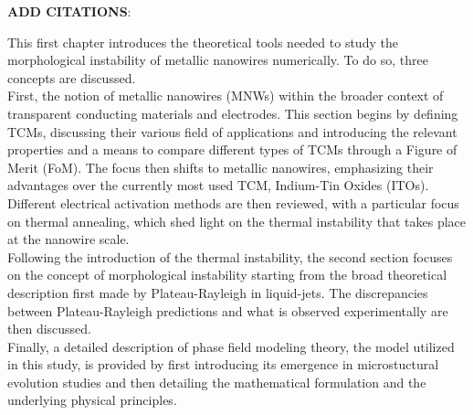 \textbf{ADD CITATIONS}: \cite{Huong2022} \cite{Willis2021} \cite{Maurya2022} \cite{LagrangeLangleyGiustiJimenezBrechetBellet2015} \cite{LangleyGiustiMayousseCelleBelletSimonato2013} \cite{SohnParkOhKangKim2019} \cite{Bellet2017} \cite{JiuSuganuma2016} \cite{BerginChenRathmellCharbonneauLiWiley2012} \cite{Langley2014} \cite{KwanLeHuan2016} \cite{GrazioliGangiNicolaSimone2024} \cite{Bardet2021} \cite{MarzbanradRiversPengZhaoZhou2015}

This first chapter introduces the theoretical tools needed to study the morphological instability of metallic nanowires numerically. To do so, three concepts are discussed.\\
First, the notion of metallic nanowires (MNWs) within the broader context of transparent conducting materials and electrodes. This section begins by defining TCMs, discussing their various field of applications and introducing the relevant properties and a means to compare different types of TCMs through a Figure of Merit (FoM). The focus then shifts to metallic nanowires, emphasizing their advantages over the currently most used TCM, Indium-Tin Oxides (ITOs). Different electrical activation methods are then reviewed, with a particular focus on thermal annealing, which shed light on the thermal instability that takes place at the nanowire scale.\\
Following the introduction of the thermal instability, the second section focuses on the concept of morphological instability starting from the broad theoretical description first made by Plateau-Rayleigh in liquid-jets. The discrepancies between Plateau-Rayleigh predictions and what is observed experimentally are then discussed.\\
Finally, a detailed description of phase field modeling theory, the model utilized in this study, is provided by first introducing its emergence in microstuctural evolution studies and then detailing the mathematical formulation and the underlying physical principles.
